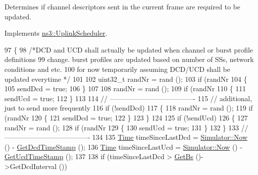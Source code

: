 Determines if channel descriptors sent in the current frame are required to be updated. 



Implements \hyperlink{classns3_1_1UplinkScheduler_ae500207af8583a3595da89edcc20b851}{ns3\+::\+Uplink\+Scheduler}.


\begin{DoxyCode}
97 \{
98   \textcolor{comment}{/*DCD and UCD shall actually be updated when channel or burst profile definitions}
99 \textcolor{comment}{   change. burst profiles are updated based on number of SSs, network conditions and etc.}
100 \textcolor{comment}{   for now temporarily assuming DCD/UCD shall be updated everytime */}
101 
102   uint32\_t randNr = rand ();
103   \textcolor{keywordflow}{if} (randNr %
104     \{
105       sendDcd = \textcolor{keyword}{true};
106     \}
107 
108   randNr = rand ();
109   \textcolor{keywordflow}{if} (randNr %
110     \{
111       sendUcd = \textcolor{keyword}{true};
112     \}
113 
114   \textcolor{comment}{// -------------------------------------}
115   \textcolor{comment}{// additional, just to send more frequently}
116   \textcolor{keywordflow}{if} (!sendDcd)
117     \{
118       randNr = rand ();
119       \textcolor{keywordflow}{if} (randNr %
120         \{
121           sendDcd = \textcolor{keyword}{true};
122         \}
123     \}
124 
125   \textcolor{keywordflow}{if} (!sendUcd)
126     \{
127       randNr = rand ();
128       \textcolor{keywordflow}{if} (randNr %
129         \{
130           sendUcd = \textcolor{keyword}{true};
131         \}
132     \}
133   \textcolor{comment}{// -------------------------------------}
134 
135   \hyperlink{namespacens3_1_1TracedValueCallback_a7ffd3e7c142ffe7c8a1d2db9b8de38ec}{Time} timeSinceLastDcd = \hyperlink{classns3_1_1Simulator_ac3178fa975b419f7875e7105be122800}{Simulator::Now} () - \hyperlink{classns3_1_1UplinkScheduler_a3db19e92a24c71af7d6aff5e94d488fe}{GetDcdTimeStamp} ();
136   \hyperlink{namespacens3_1_1TracedValueCallback_a7ffd3e7c142ffe7c8a1d2db9b8de38ec}{Time} timeSinceLastUcd = \hyperlink{classns3_1_1Simulator_ac3178fa975b419f7875e7105be122800}{Simulator::Now} () - \hyperlink{classns3_1_1UplinkScheduler_a709e1a0e3c5ab174b0e1bc123dcfd676}{GetUcdTimeStamp} ();
137 
138   \textcolor{keywordflow}{if} (timeSinceLastDcd > \hyperlink{classns3_1_1UplinkScheduler_afe61b7de71d92d2dff1b135744a6ff7e}{GetBs} ()->GetDcdInterval ())

\end{DoxyCode}
